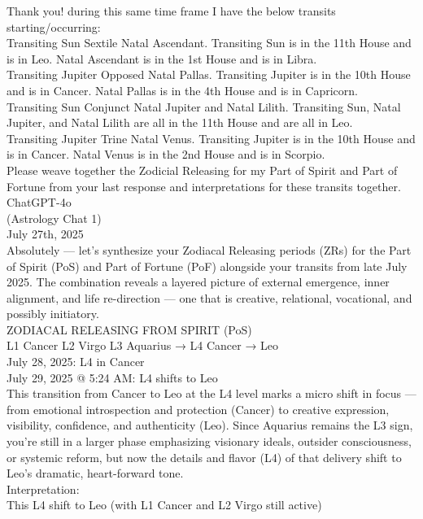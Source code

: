 \documentclass{article}
\begin{document}
Thank you! during this same time frame I have the below transits
starting/occurring:\\
Transiting Sun Sextile Natal Ascendant. Transiting Sun is in the 11th
House and is in Leo. Natal Ascendant is in the 1st House and is in
Libra.\\
Transiting Jupiter Opposed Natal Pallas. Transiting Jupiter is in the
10th House and is in Cancer. Natal Pallas is in the 4th House and is in
Capricorn.\\
Transiting Sun Conjunct Natal Jupiter and Natal Lilith. Transiting Sun,
Natal Jupiter, and Natal Lilith are all in the 11th House and are all in
Leo.\\
Transiting Jupiter Trine Natal Venus. Transiting Jupiter is in the 10th
House and is in Cancer. Natal Venus is in the 2nd House and is in
Scorpio.\\
Please weave together the Zodicial Releasing for my Part of Spirit and
Part of Fortune from your last response and interpretations for these
transits together.\\
ChatGPT-4o\\
(Astrology Chat 1)\\
July 27th, 2025\\
Absolutely --- let's synthesize your Zodiacal Releasing periods (ZRs)
for the Part of Spirit (PoS) and Part of Fortune (PoF) alongside your
transits from late July 2025. The combination reveals a layered picture
of external emergence, inner alignment, and life re-direction --- one
that is creative, relational, vocational, and possibly initiatory.\\
 ZODIACAL RELEASING FROM SPIRIT (PoS)\\
L1 Cancer \textbar{} L2 Virgo \textbar{} L3 Aquarius → L4 Cancer → Leo\\
July 28, 2025: L4 in Cancer\\
July 29, 2025 @ 5:24 AM: L4 shifts to Leo\\
This transition from Cancer to Leo at the L4 level marks a micro shift
in focus --- from emotional introspection and protection (Cancer) to
creative expression, visibility, confidence, and authenticity (Leo).
Since Aquarius remains the L3 sign, you're still in a larger phase
emphasizing visionary ideals, outsider consciousness, or systemic
reform, but now the details and flavor (L4) of that delivery shift to
Leo's dramatic, heart-forward tone.\\
Interpretation:\\
This L4 shift to Leo (with L1 Cancer and L2 Virgo still active)
\end{document}
